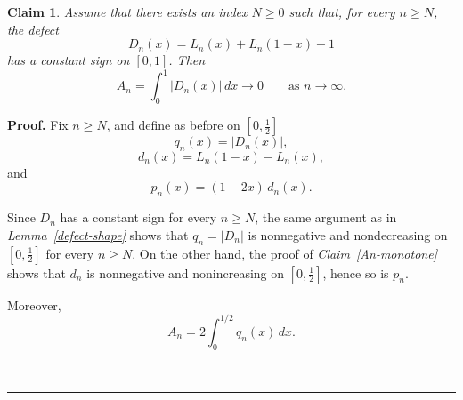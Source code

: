 \documentclass[onecolumn]{article}
\newtheorem{claim}[theorem]{Claim}
\newenvironment{proof}[1][Proof]{\noindent\textbf{#1.} }{\ \rule{0.5em}{0.5em}}
\begin{document}
\begin{claim}
\label{An-vanishing} Assume that there exists an index $N\geq 0$ such that,
for every $n\geq N$, the defect 
\begin{equation}
D_{n}(x)=L_{n}(x)+L_{n}(1-x)-1  \label{1271.1}
\end{equation}%
has a constant sign on $[0,1]$. Then 
\begin{equation}
A_{n}=\int_{0}^{1}|D_{n}(x)|\,dx\longrightarrow 0\qquad \text{as }%
n\rightarrow \infty .  \label{1272}
\end{equation}
\end{claim}

\begin{proof}
\noindent Fix $n\geq N$, and define as before on $[0,\tfrac{1}{2}]$ 
\begin{equation}
q_{n}(x)=|D_{n}(x)|,  \label{1273}
\end{equation}%
\begin{equation}
d_{n}(x)=L_{n}(1-x)-L_{n}(x),  \label{1274}
\end{equation}%
and 
\begin{equation}
p_{n}(x)=(1-2x)\,d_{n}(x).  \label{1275}
\end{equation}

Since $D_{n}$ has a constant sign for every $n\geq N$, the same argument as
in \textit{Lemma~\ref{defect-shape}} shows that $q_{n}=|D_{n}|$ is
nonnegative and nondecreasing on $[0,\tfrac{1}{2}]$ for every $n\geq N$. On
the other hand, the proof of \textit{Claim~\ref{An-monotone}} shows that $%
d_{n}$ is nonnegative and nonincreasing on $[0,\tfrac{1}{2}]$, hence so is $%
p_{n}$.

Moreover, 
\begin{equation}
A_{n}=2\int_{0}^{1/2}q_{n}(x)\,dx.  \label{1276}
\end{equation}


\end{proof}
\end{document}
